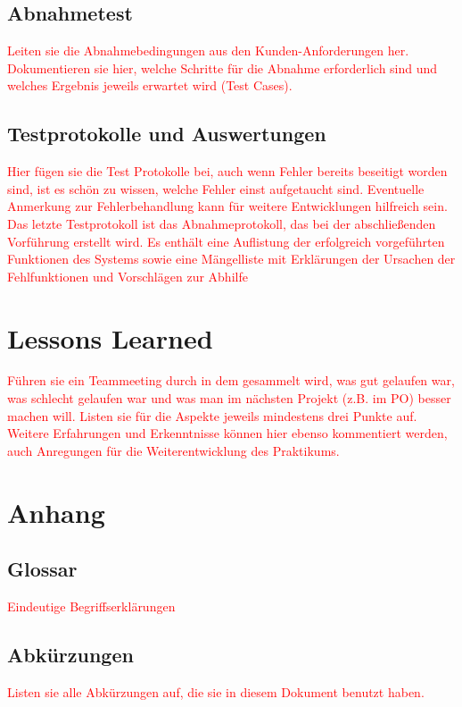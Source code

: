 \documentclass[a4paper, 11pt]{article}
\begin{document}
\subsection{Abnahmetest}
\textcolor{red}{Leiten sie die Abnahmebedingungen aus den Kunden-Anforderungen her. Dokumentieren sie hier, welche Schritte für die Abnahme erforderlich sind und welches Ergebnis jeweils erwartet wird (Test Cases).}

\subsection{Testprotokolle und Auswertungen}
\textcolor{red}{Hier fügen sie die Test Protokolle bei, auch wenn Fehler bereits beseitigt worden sind, ist es schön zu wissen, welche Fehler einst aufgetaucht sind. Eventuelle Anmerkung zur Fehlerbehandlung kann für weitere Entwicklungen hilfreich sein.
Das letzte Testprotokoll ist das Abnahmeprotokoll, das bei der abschließenden Vorführung erstellt wird. Es enthält eine Auflistung der erfolgreich vorgeführten Funktionen des Systems sowie eine Mängelliste mit Erklärungen der Ursachen der Fehlfunktionen und Vorschlägen zur Abhilfe
}

\section{Lessons Learned}
\textcolor{red}{Führen sie ein Teammeeting durch in dem gesammelt wird, was gut gelaufen war, was schlecht gelaufen war und was man im nächsten Projekt (z.B. im PO) besser machen will. Listen sie für die Aspekte jeweils mindestens drei Punkte auf. Weitere Erfahrungen und Erkenntnisse können hier ebenso kommentiert werden, auch Anregungen für die Weiterentwicklung des Praktikums.}

\section{Anhang}

\subsection{Glossar}
\textcolor{red}{Eindeutige Begriffserklärungen}

\subsection{Abkürzungen}
\textcolor{red}{Listen sie alle Abkürzungen auf, die sie in diesem Dokument benutzt haben.}
\end{document}
